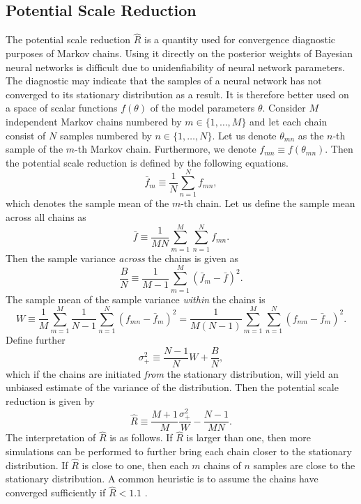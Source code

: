 \subsection{Potential Scale Reduction}
The potential scale reduction $\hat{R}$ \cite{rhat} is a quantity used for convergence diagnostic purposes of Markov chains. Using it directly on the posterior weights of Bayesian neural networks is difficult due to unidenfiability of neural network parameters. The diagnostic may indicate that the samples of a neural network has not converged to its stationary distribution as a result. It is therefore better used on a space of scalar functions $f(\theta)$ of the model parameters $\theta$.
Consider $M$ independent Markov chains numbered by $m \in \{1, \ldots, M\}$ and let each chain consist of $N$ samples numbered by $n \in \{1, \ldots, N\}$. 
Let us denote $\theta_{mn}$ as the $n$-th sample of the $m$-th Markov chain.
Furthermore, we denote $f_{mn} \equiv f(\theta_{mn})$. Then the potential scale reduction is defined by the following equations.
\begin{equation}
    \bar{f}_m \equiv \frac{1}{N}\sum_{n=1}^N f_{mn},
\end{equation}
which denotes the sample mean of the $m$-th chain. Let us define the sample mean across all chains as
\begin{equation}
    \bar{f} \equiv \frac{1}{MN}\sum_{m=1}^M\sum_{n=1}^N f_{mn}.
\end{equation}
Then the sample variance \textit{across} the chains is given as
\begin{equation}
    \frac{B}{N} \equiv \frac{1}{M-1} \sum_{m=1}^M (\bar{f}_m - \bar{f})^2.
\end{equation}
The sample mean of the sample variance \textit{within} the chains is
\begin{equation}
    W \equiv \frac{1}{M}\sum_{m=1}^M \frac{1}{N-1}\sum_{n=1}^N(f_{mn} - \bar{f}_m)^2 = \frac{1}{M(N-1)}\sum_{m=1}^M \sum_{n=1}^N (f_{mn} - \bar{f}_m)^2.
\end{equation}
Define further
\begin{equation}
    \sigma_+^2 \equiv \frac{N-1}{N}W + \frac{B}{N},
\end{equation}
which if the chains are initiated \textit{from} the stationary distribution, will yield an unbiased estimate of the variance of the distribution.
Then the potential scale reduction is given by 
\begin{equation}
    \hat{R} \equiv \frac{M + 1}{M}\frac{\sigma_+^2}{W} - \frac{N - 1}{MN}.
\end{equation}
The interpretation of $\hat{R}$ is as follows. If $\hat{R}$ is larger than one, then more simulations can be performed to further bring each chain closer to the stationary distribution. If $\hat{R}$ is close to one, then each $m$ chains of $n$ samples are close to the stationary distribution. A common heuristic is to assume the chains have converged sufficiently if $\hat{R} < 1.1$ \cite{convergence_diagnostics}.



